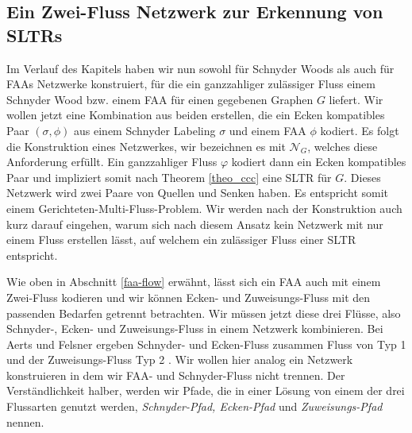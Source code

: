\subsection{Ein Zwei-Fluss Netzwerk zur Erkennung von SLTRs}

Im Verlauf des Kapitels haben wir nun sowohl für Schnyder Woods als auch für FAAs Netzwerke konstruiert, für die ein ganzzahliger zulässiger Fluss einem Schnyder Wood bzw. einem FAA für einen gegebenen Graphen $G$ liefert. Wir wollen jetzt eine Kombination aus beiden erstellen, die ein Ecken kompatibles Paar $(\sigma,\phi)$ aus einem Schnyder Labeling $\sigma$ und einem FAA $\phi$  kodiert. Es folgt die Konstruktion eines Netzwerkes, wir bezeichnen es mit $\mathcal{N}_G$, welches diese Anforderung erfüllt. Ein ganzzahliger Fluss $\varphi$ kodiert dann ein Ecken kompatibles Paar und impliziert somit nach Theorem \ref{theo_ccc} eine SLTR für $G$. Dieses Netzwerk wird zwei Paare von Quellen und Senken haben. Es entspricht somit einem Gerichteten-Multi-Fluss-Problem. Wir werden nach der Konstruktion auch kurz darauf eingehen, warum sich nach diesem Ansatz kein Netzwerk mit nur einem Fluss erstellen lässt, auf welchem ein zulässiger Fluss einer SLTR entspricht.

Wie oben in Abschnitt \ref{faa-flow} erwähnt, lässt sich ein FAA auch mit einem Zwei-Fluss kodieren und wir können Ecken- und Zuweisungs-Fluss mit den passenden Bedarfen getrennt betrachten. Wir müssen jetzt diese drei Flüsse, also Schnyder-, Ecken- und Zuweisungs-Fluss in einem Netzwerk kombinieren. Bei Aerts und Felsner ergeben Schnyder- und Ecken-Fluss zusammen Fluss von Typ 1 und der Zuweisungs-Fluss Typ 2 \cite{af15}. Wir wollen hier analog ein Netzwerk konstruieren in dem wir FAA- und Schnyder-Fluss nicht trennen. Der Verständlichkeit halber, werden wir Pfade, die in einer Lösung von einem der drei Flussarten genutzt werden, \textit{Schnyder-Pfad, Ecken-Pfad} und \textit{Zuweisungs-Pfad} nennen.

